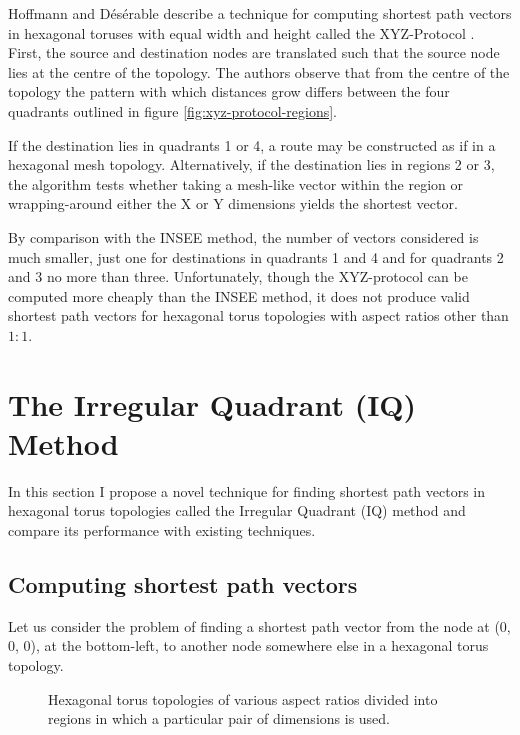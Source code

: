 				Hoffmann and D\'es\'erable describe a technique for computing shortest
				path vectors in hexagonal toruses with equal width and height called
				the XYZ-Protocol \cite{hoffmann15,hoffmann11}. First, the source and
				destination nodes are translated such that the source node lies at the
				centre of the topology. The authors observe that from the centre of the
				topology the pattern with which distances grow differs between the four
				quadrants outlined in figure \ref{fig:xyz-protocol-regions}.
				
				If the destination lies in quadrants 1 or 4, a route may be constructed
				as if in a hexagonal mesh topology. Alternatively, if the destination
				lies in regions 2 or 3, the algorithm tests whether taking a mesh-like
				vector within the region or wrapping-around either the X or Y
				dimensions yields the shortest vector.
				
				By comparison with the INSEE method, the number of vectors considered
				is much smaller, just one for destinations in quadrants 1 and 4 and for
				quadrants 2 and 3 no more than three. Unfortunately, though the
				XYZ-protocol can be computed more cheaply than the INSEE method, it
				does not produce valid shortest path vectors for hexagonal torus
				topologies with aspect ratios other than $1:1$.
		
	\section{The Irregular Quadrant (IQ) Method}
		
		In this section I propose a novel technique for finding shortest path
		vectors in hexagonal torus topologies called the Irregular Quadrant (IQ)
		method and compare its performance with existing techniques.
		
		\subsection{Computing shortest path vectors}
		
			Let us consider the problem of finding a shortest path vector from the node
			at (0, 0, 0), at the bottom-left, to another node somewhere else in a
			hexagonal torus topology.
			
			\begin{figure}
				\center
				
				\caption{Hexagonal torus topologies of various aspect ratios divided
				into regions in which a particular pair of dimensions is used.}
				\label{fig:shortest-path-regions}
			\end{figure}
			
